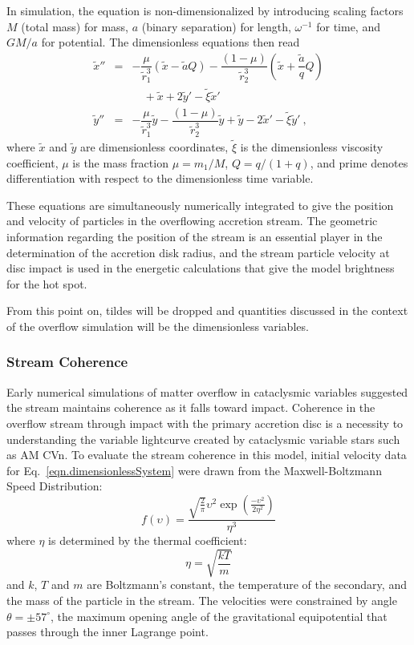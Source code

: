\documentclass[preprint2]{aastex}
\begin{document}
In simulation, the equation is non-dimensionalized by introducing
scaling factors $M$ (total mass) for mass, $a$ (binary separation) for
length, $\omega^{-1}$ for time, and $GM/a$ for potential.  The
dimensionless equations then read
\begin{eqnarray}
   \tilde{x}'' &=& -\dfrac{\mu}{\tilde{r}_1^3}(\tilde{x} - \tilde{a}Q) -
   \dfrac{(1-\mu)}{\tilde{r}_2^3}\left (\tilde{x} +
   \dfrac{\tilde{a}}{q}Q\right ) \nonumber \\
   & &\quad + \tilde{x} + 2\tilde{y}' - \tilde{\xi}\tilde{x}' 
   \nonumber \\
   \tilde{y}'' &=& -\dfrac{\mu}{\tilde{r}_1^3}\tilde{y} -
   \dfrac{(1-\mu)}{\tilde{r}_2^3}\tilde{y} + \tilde{y} - 2\tilde{x}' -
   \tilde{\xi}\tilde{y}'\ ,
   \label{eqn.dimensionlessSystem}
\end{eqnarray}
where $\tilde{x}$ and $\tilde{y}$ are dimensionless coordinates,
$\tilde{\xi}$ is the dimensionless viscosity coefficient, $\mu$ is the
mass fraction $\mu = m_1/M$, $Q=q/(1+q)$, and prime denotes
differentiation with respect to the dimensionless time variable.

These equations are simultaneously numerically integrated to give 
the position and velocity of particles in the overflowing accretion 
stream. The geometric information regarding the position of the 
stream is an essential player in the determination of the accretion 
disk radius, and the stream particle velocity at disc impact is used 
in the energetic calculations that give the model brightness for the 
hot spot.

From this point on, tildes will be dropped and quantities discussed in
the context of the overflow simulation will be the dimensionless
variables.

\subsubsection{Stream Coherence}
Early numerical simulations \citep{Flannery1975} of matter overflow in
cataclysmic variables suggested the stream maintains coherence as it
falls toward impact.  Coherence in the overflow stream through impact
with the primary accretion disc is a necessity to understanding the
variable lightcurve created by cataclysmic variable stars such as AM
CVn.  To evaluate the stream coherence in this model, initial 
velocity data for Eq.\ \ref{eqn.dimensionlessSystem} were drawn from the
Maxwell-Boltzmann Speed Distribution:
\begin{equation}
   f(\upsilon)=\frac{\sqrt{\frac{2}{\pi}}\upsilon^2
   \exp(\frac{-\upsilon^2}{2\eta^2})}{\eta^3}
\end{equation}
where $\eta$ is determined by the thermal coefficient:
\begin{equation}
	\eta=\sqrt{\frac{kT}{m}}
\end{equation}
and $k$, $T$ and $m$ are Boltzmann's constant, the temperature of the
secondary, and the mass of the particle in the stream. The velocities were constrained by angle $\theta=\pm57^{\circ}$, the
maximum opening angle of the gravitational equipotential that passes
through the inner Lagrange point.  
\end{document}
